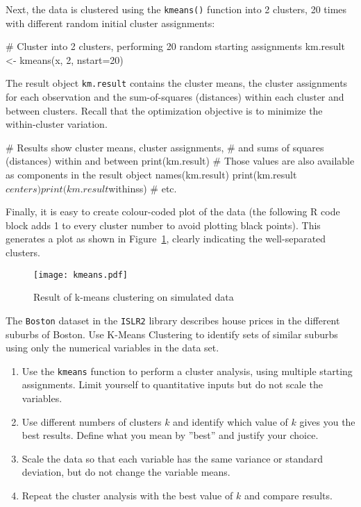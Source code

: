 \noindent Next, the data is clustered using the \texttt{kmeans()} function into 2 clusters, 20 times with different random initial cluster assignments:

\begin{Rcode}
# Cluster into 2 clusters, performing 20 random starting assignments
km.result <- kmeans(x, 2, nstart=20)
\end{Rcode}

The result object \texttt{km.result} contains the cluster means, the cluster assignments for each observation and the sum-of-squares (distances) within each cluster and between clusters. Recall that the optimization objective is to minimize the within-cluster variation.

\begin{Rcode}
# Results show cluster means, cluster assignments, 
# and sums of squares (distances) within and between 
print(km.result)
# Those values are also available as components in the result object
names(km.result)
print(km.result$centers)
print(km.result$withinss)
# etc.
\end{Rcode}

Finally, it is easy to create colour-coded plot of the data (the following R code block adds 1 to every cluster number to avoid plotting black points). This generates a plot as shown in Figure~\ref{fig:kmeans4}, clearly indicating the well-separated clusters.


\begin{figure}
\centering

\texttt{[image: kmeans.pdf]}
\caption{Result of k-means clustering on simulated data}
\label{fig:kmeans4}
\end{figure}


\begin{exercisebox}

The \texttt{Boston} dataset in the \texttt{ISLR2} library describes house prices in the different suburbs of Boston. Use K-Means Clustering to identify sets of similar suburbs using only the numerical variables in the data set.
\begin{enumerate}
   \item Use the \texttt{kmeans} function to perform a cluster analysis, using multiple starting assignments. Limit yourself to quantitative inputs but do not scale the variables.
   \item Use different numbers of clusters $k$ and identify which value of $k$ gives you the best results. Define what you mean by ''best'' and justify your choice.
   \item Scale the data so that each variable has the same variance or standard deviation, but do not change the variable means. 
   \item Repeat the cluster analysis with the best value of $k$ and compare results.\end{enumerate}
\end{exercisebox}

